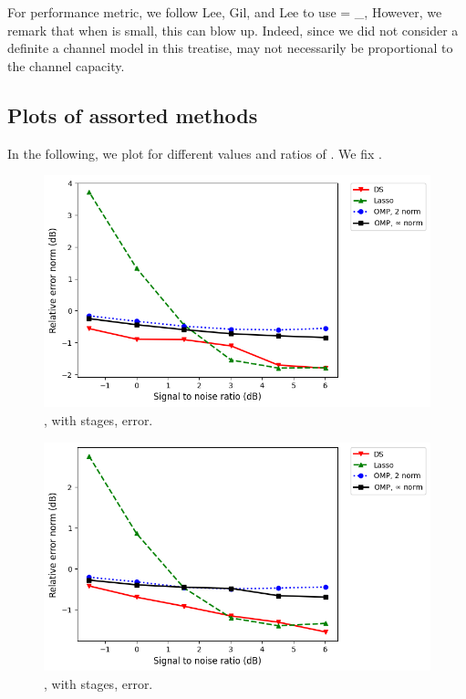 For performance metric, we follow Lee, Gil, and Lee \cite {LGL16} to use
 {
\tilde {\chi}
= _{}, 
}
However, we remark that when  is small, this can blow up.
Indeed, since we did not consider a definite a channel model in this treatise, \m {\T {\chi}} may not necessarily be proportional to the channel capacity.

\subsection {Plots of assorted methods}

In the following, we plot for different values and ratios of .
We fix .
%
\begin {figure} [H]
\includegraphics [width = 0.8 \textwidth] {error-small-more-square-six-usual.png}
\caption {, with  stages, error.}
\end {figure}
%
\begin {figure} [H]
\includegraphics [width = 0.8 \textwidth] {error-small-more-wide-six-usual.png}
\caption {, with  stages, error.}
\end {figure}
